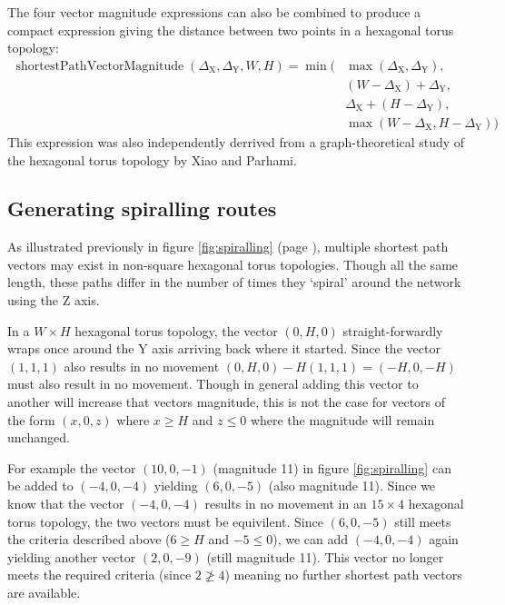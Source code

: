 			The four vector magnitude expressions can also be combined to produce a
			compact expression giving the distance between two points in a hexagonal
			torus topology:
			\begin{align*}
				\operatorname{shortestPathVectorMagnitude}(\Delta_\textrm{X}, \Delta_\textrm{Y}, W, H) =
				\operatorname{min}(&\operatorname{max}(\Delta_\textrm{X}, \Delta_\textrm{Y}),\\
				                   &(W - \Delta_\textrm{X}) + \Delta_\textrm{Y},\\
				                   &\Delta_\textrm{X} + (H - \Delta_\textrm{Y}),\\
				                   &\operatorname{max}(W-\Delta_\textrm{X}, H-\Delta_\textrm{Y}))
			\end{align*}
			This expression was also independently derrived from a graph-theoretical
			study of the hexagonal torus topology by Xiao and Parhami\cite{xiao04}.
		
		\subsection{Generating spiralling routes}
			
			As illustrated previously in figure \ref{fig:spiralling} (page
			\pageref{fig:spiralling}), multiple shortest path vectors may exist in
			non-square hexagonal torus topologies. Though all the same length, these
			paths differ in the number of times they `spiral' around the network
			using the Z axis.
			
			In a $W \times H$ hexagonal torus topology, the vector $(0, H, 0)$
			straight-forwardly wraps once around the Y axis arriving back where it
			started. Since the vector $(1,1,1)$ also results in no movement $(0,H,0)
			- H(1,1,1) = (-H, 0, -H)$ must also result in no movement. Though in
			general adding this vector to another will increase that vectors
			magnitude, this is not the case for vectors of the form $(x, 0, z)$ where
			$x\ge H$ and $z\le0$ where the magnitude will remain unchanged.
			
			For example the vector $(10, 0, -1)$ (magnitude 11) in figure
			\ref{fig:spiralling} can be added to $(-4, 0, -4)$ yielding $(6, 0, -5)$
			(also magnitude 11). Since we know that the vector $(-4, 0, -4)$ results
			in no movement in an $15\times4$ hexagonal torus topology, the two
			vectors must be equivilent. Since $(6, 0, -5)$ still meets the criteria
			described above ($6 \ge H$ and $-5 \le 0$), we can add $(-4, 0, -4)$
			again yielding another vector $(2, 0, -9)$ (still magnitude 11). This
			vector no longer meets the required criteria (since $2 \ngeq 4$) meaning
			no further shortest path vectors are available.
			
